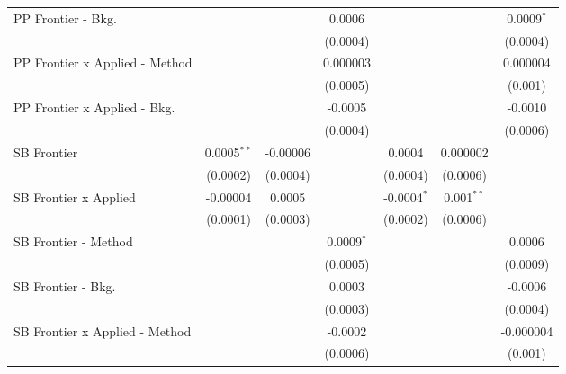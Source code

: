 \begin{tabular}{lcccccc}
   PP Frontier - Bkg.             &                &               & 0.0006         &                &                & 0.0009$^{*}$\\   
                                  &                &               & (0.0004)       &                &                & (0.0004)\\   
   PP Frontier x Applied - Method &                &               & 0.000003       &                &                & 0.000004\\   
                                  &                &               & (0.0005)       &                &                & (0.001)\\   
   PP Frontier x Applied - Bkg.   &                &               & -0.0005        &                &                & -0.0010\\   
                                  &                &               & (0.0004)       &                &                & (0.0006)\\   
   SB Frontier                    & 0.0005$^{**}$  & -0.00006      &                & 0.0004         & 0.000002       &   \\   
                                  & (0.0002)       & (0.0004)      &                & (0.0004)       & (0.0006)       &   \\   
   SB Frontier x Applied          & -0.00004       & 0.0005        &                & -0.0004$^{*}$  & 0.001$^{**}$   &   \\   
                                  & (0.0001)       & (0.0003)      &                & (0.0002)       & (0.0006)       &   \\   
   SB Frontier - Method           &                &               & 0.0009$^{*}$   &                &                & 0.0006\\   
                                  &                &               & (0.0005)       &                &                & (0.0009)\\   
   SB Frontier - Bkg.             &                &               & 0.0003         &                &                & -0.0006\\   
                                  &                &               & (0.0003)       &                &                & (0.0004)\\   
   SB Frontier x Applied - Method &                &               & -0.0002        &                &                & -0.000004\\   
                                  &                &               & (0.0006)       &                &                & (0.001)\\   

\end{tabular}

